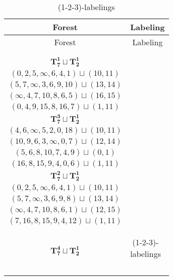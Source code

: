 \documentclass{article}
\begin{document}
    \begin{longtable}{|c|c|}
    \hline
    Forest & Labeling \\
    \hline
    \endfirsthead
    
    \hline
    Forest & Labeling \\
    \hline
    \endhead
    
    \hline
    \caption{(1-2-3)-labelings} \\
    \endfoot
    
    \hline
    \caption{(1-2-3)-labelings} \label{tab:1-rot(1-2-3)}\\
    \endlastfoot
        $\mathbf{T_{7}^{1}} \sqcup \mathbf{T_{2}^{1}}$ & \begin{tabular}{c}
        $(0,1,\infty,2,4,5,3)\sqcup(12,15)$ \\ 
        $(0,2,5,\infty,6,4,1)\sqcup(10,11)$ \\ 
        $(5,7,\infty,3,6,9,10)\sqcup(13,14)$ \\ 
        $(\infty,4,7,10,8,6,5)\sqcup(16,15)$ \\ 
        $(0,4,9,15,8,16,7)\sqcup(1,11)$
        \end{tabular} \\ 
        \hline
        $\mathbf{T_{7}^{3}} \sqcup \mathbf{T_{2}^{1}}$ & \begin{tabular}{c}
        $(3,5,4,2,\infty,8,1)\sqcup(12,15)$ \\ 
        $(4,6,\infty,5,2,0,18)\sqcup(10,11)$ \\ 
        $(10,9,6,3,\infty,0,7)\sqcup(12,14)$ \\ 
        $(5,6,8,10,7,4,9)\sqcup(0,1)$ \\ 
        $(16,8,15,9,4,0,6)\sqcup(1,11)$
        \end{tabular} \\ 
        \hline
        $\mathbf{T_{7}^{2}} \sqcup \mathbf{T_{2}^{1}}$ & \begin{tabular}{c}
        $(3,5,4,2,\infty,1,6)\sqcup(9,10)$ \\ 
        $(0,2,5,\infty,6,4,1)\sqcup(10,11)$ \\ 
        $(5,7,\infty,3,6,9,8)\sqcup(13,14)$ \\ 
        $(\infty,4,7,10,8,6,1)\sqcup(12,15)$ \\ 
        $(7,16,8,15,9,4,12)\sqcup(1,11)$
        \end{tabular} \\ 
        \hline
        $\mathbf{T_{7}^{4}} \sqcup \mathbf{T_{2}^{1}}$ & \begin{tabular}{c}

\end{tabular}
\end{longtable}
\end{document}
